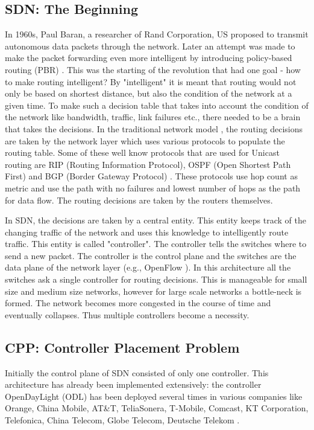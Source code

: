 \documentclass[a4paper,twocolumn,preprint]{elsarticle}
\begin{document}
\subsection{SDN: The Beginning}
In 1960s, Paul Baran, a researcher of Rand Corporation, US proposed to transmit autonomous data packets \cite{goransson2014software1} through the network. Later an attempt was made to make the packet forwarding even more intelligent by introducing policy-based routing (PBR) \cite{goransson2014software2}. This was the starting of the revolution that had one goal - how to make routing intelligent? By "intelligent" it is meant that routing would not only be based on shortest distance, but also the condition of the network at a given time.
To make such a decision table that takes into account the condition of the network like bandwidth, traffic, link failures etc., there needed to be a brain that takes the decisions. In the traditional network model \cite{forouzan2006data}, the routing decisions are taken by the network layer which uses various protocols to populate the routing table. Some of these well know protocols that are used for Unicast routing are RIP (Routing Information Protocol), OSPF (Open Shortest Path First) and BGP (Border Gateway Protocol) \cite{forouzan2002tcp}. These protocols use hop count as metric and use the path with no failures and lowest number of hops as the path for data flow. The routing decisions are taken by the routers themselves.

In SDN, the decisions are taken by a central entity. This entity keeps track of the changing traffic of the network and uses this knowledge to intelligently route traffic. This entity is called "controller". The controller tells the switches where to send a new packet. The controller is the control plane and the switches are the data plane of the network layer (e.g., OpenFlow \cite{hu2014survey, sdniotsurvey2016}). In this architecture all the switches ask a single controller for routing decisions. This is manageable for small size and medium size networks, however for large scale networks a bottle-neck is formed. The network becomes more congested in the course of time and eventually collapses. Thus multiple controllers become a necessity.

\subsection{CPP: Controller Placement Problem}
Initially the control plane of SDN consisted of only one controller. This architecture has already been implemented extensively: the controller OpenDayLight (ODL) \cite{odl} has been deployed several times in various companies like Orange, China Mobile, AT\&T, TeliaSonera, T-Mobile, Comcast, KT Corporation, Telefonica, China Telecom, Globe Telecom, Deutsche Telekom \cite{sdnsurvey2017}.
\end{document}
